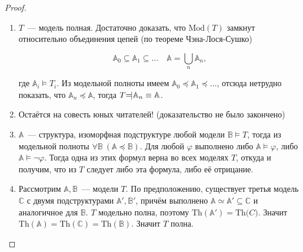 \begin{proof} \

    \begin{enumerate}
        \item $T$~— модель полная. Достаточно доказать, что $\text{Mod}(T)$ замкнут относительно объединения цепей (по теореме Чэна-Лося-Сушко)
         
        \[ 
            \mathbb{A}_0 \subseteq \mathbb{A}_1 \subseteq \ldots \quad \mathbb{A} = \bigcup_n \mathbb{A}_n,
        \]

        где $\mathbb{A}_i \models T_i$.
        Из модельной полноты имеем $\mathbb{A}_0 \preceq \mathbb{A}_1 \preceq \ldots$, отсюда нетрудно показать, что $\mathbb{A}_n \preceq \mathbb{A}$, тогда $T \text{\rotatebox[origin=c]{180}{$\models$}} \mathbb{A}_n \equiv \mathbb{A}$. 
        
        \item Остаётся на совесть юных читателей! (доказательство не было закончено)

        \item $\mathbb{A}$~— структура, изоморфная подструктуре любой модели $\mathbb{B} \models T$, тогда из модельной полноты $\forall \mathbb{B}~(\mathbb{A} \preceq \mathbb{B})$. Для любой $\varphi$ выполнено либо $\mathbb{A} \models \varphi$, либо $\mathbb{A} \models \neg \varphi$. Тогда одна из этих формул верна во всех моделях $T$, откуда и получим, что из $T$ следует либо эта формула, либо её отрицание. 

        \item Рассмотрим $\mathbb{A}, \mathbb{B}$~— модели $T$. По предположению, существует третья модель $\mathbb{C}$ с двумя подструктурами $\mathbb{A}', \mathbb{B}'$, причём выполнено $\mathbb{A}\simeq\mathbb{A}'\subseteq\mathbb{C}$ и аналогичное для $\mathbb{B}$. $T$ модельно полна, поэтому $\text{Th}(\mathbb{A}')=\text{Th}{\mathbb(C)}$. Значит $\text{Th}(\mathbb{A})=\text{Th}(\mathbb{C})=\text{Th}(\mathbb{B})$. Значит $T$ полна.
    \end{enumerate}
\end{proof}
